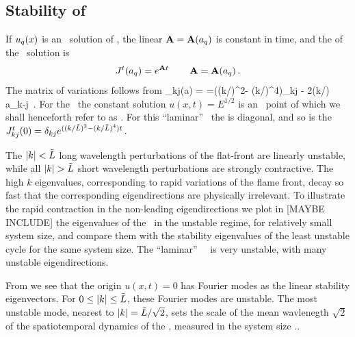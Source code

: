 \subsection{Stability of \eqva}
\label{s:StabEqui}

If $u_q(x)$ is an \eqv\ solution of \KSe,
the linear {\stabmat}
${\bf A}={\bf A}(a_q)$
is constant in time,
and  
the {\jacobianM}
of the \eqv\ solution is
\[
 {J}^t(a_q) = e^{{\bf A} t}
    \,\qquad
 {\bf \ensuremath{A}}={\bf A}(a_q)
\,.
\]
The matrix of variations
follows from 
\beq
{\Mvar}_{kj}(a) =
=((k/\tildeL)^2- (k/\tildeL)^4)\delta_{kj} - 2(k/\tildeL) a_{k-j}
\,.
For the \KSe\ the constant solution $u(x,t)= E^{1/2}$ is an 
\eqv\ point of  which we shall henceforth refer to as
. For this ``laminar'' \eqv\ the {\stabmat}
is diagonal, and 
so is the {\jacobianM}
$
{J}^t_{kj}(0) = \delta_{kj} e^{((k/\tilde{L})^2- (k/\tilde{L})^4)t}
\,.
$

The $|k|<\tilde{L}$ 
long wavelength perturbations of the flat-front {\eqv}
are linearly unstable, while all 
$|k|> \tildeL$ short wavelength perturbations are strongly contractive.  
The high $k$ eigenvalues, corresponding to rapid variations of
the flame front, decay so fast that the corresponding eigendirections
are physically irrelevant.
To illustrate the rapid contraction in the non-leading eigendirections
we plot  in [MAYBE INCLUDE] %
the eigenvalues of the \eqv\ in the unstable regime,
for relatively small system size, %
and compare them with the
stability eigenvalues of the least unstable cycle for the same 
system size.
The ``laminar'' ~\eqv\ is very unstable,
with many unstable eigendirections. 


From  we see that the origin $u(x,t) = 0$
has Fourier modes as the  linear
stability eigenvectors. 
For $0 \leq |k| \leq \tilde{L}$, these Fourier modes are
unstable.
The most unstable mode, nearest to $|k|=\tilde{L}/\sqrt{2}$,
sets the scale of the mean wavlenegth $\sqrt{2}$
of the spatiotemporal dynamics of the {\KSe},
measured in the system size \tildeL..


